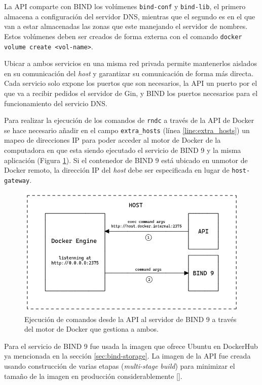 La API comparte con BIND los volúmenes \verb|bind-conf| y \verb|bind-lib|, el primero almacena a configuración del servidor DNS, mientras que el segundo es en el que van a estar almacenadas las zonas que este manejando el servidor de nombres. Estos volúmenes deben ser creados de forma externa con el comando \verb|docker volume create <vol-name>|.

Ubicar a ambos servicios en una misma red privada permite mantenerlos aislados en su comunicación del \textit{host} y garantizar su comunicación de forma más directa. Cada servicio solo expone los puertos que son necesarios, la API un puerto por el que va a recibir pedidos el servidor de Gin, y BIND los puertos necesarios para el funcionamiento del servicio DNS.

Para realizar la ejecución de los comandos de \verb|rndc| a través de la API de Docker se hace necesario añadir en el campo \verb|extra_hosts| (línea \ref{line:extra_hosts}) un mapeo de direcciones IP para poder acceder al motor de Docker de la computadora en que esta siendo ejecutado el servicio de BIND 9 y la misma aplicación (Figura \ref{fig:extra_hosts}). Si el contenedor de BIND 9 está ubicado en  unmotor de Docker remoto, la dirección IP del \textit{host} debe ser especificada en lugar de \verb|host-gateway|.

\begin{figure}[!ht]
    \centering
    \includegraphics[width=\linewidth]{draws/extra_hosts.png}
    \caption{Ejecución de comandos desde la API al servidor de BIND 9 a través del motor de Docker que gestiona a ambos.}
    \label{fig:extra_hosts}
\end{figure}

Para el servicio de BIND 9 fue usada la imagen que ofrece Ubuntu en DockerHub ya mencionada en la sección \ref{sec:bind-storage}. La imagen de la API fue creada usando construcción de varias etapas (\textit{multi-stage build}) para minimizar el tamaño de la imagen en producción considerablemente [\cite{multi-stage}].

